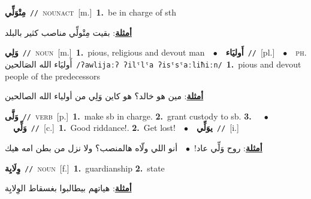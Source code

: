 \documentclass[10pt,a4paper,twoside]{article} %
\begin{document}
\begin{multicols}{2}
{\setlength\topsep{0pt}\textbf{\foreignlanguage{arabic}{مِتْوَلِّي}}\ {\color{gray}\texttt{//}\color{black}}\ \textsc{noun\textunderscore act}\ [m.]\ \textbf{1.}~be in charge of sth\  \begin{flushright}\color{gray}\foreignlanguage{arabic}{\textbf{\underline{\foreignlanguage{arabic}{أمثلة}}}: بقيت مِتْولِّي مناصب كثير بالبلد}\end{flushright}\color{black}} \vspace{2mm}

{\setlength\topsep{0pt}\textbf{\foreignlanguage{arabic}{وَلِي}}\ {\color{gray}\texttt{//}\color{black}}\ \textsc{noun}\ [m.]\ \textbf{1.}~pious, religious and devout man\ \ $\bullet$\ \ \setlength\topsep{0pt}\textbf{\foreignlanguage{arabic}{أَوليَاء}}\ {\color{gray}\texttt{//}\color{black}}\ [pl.]\ \ $\bullet$\ \ \textsc{ph.} \color{gray} \foreignlanguage{arabic}{أَوليَاء الله الصَالحين}\color{black}\ {\color{gray}\texttt{/{\sffamily ʔawlijaːʔ ʔilˤlˤa ʔisˤsˤaːliħiːn}/}\color{black}}\ \textbf{1.}~pious and devout people of the predecessors\  \begin{flushright}\color{gray}\foreignlanguage{arabic}{\textbf{\underline{\foreignlanguage{arabic}{أمثلة}}}: مين هو خالد؟ هو كاين وَلِي من أولياء الله الصالحين}\end{flushright}\color{black}} \vspace{2mm}

{\setlength\topsep{0pt}\textbf{\foreignlanguage{arabic}{وَلَّى}}\ {\color{gray}\texttt{//}\color{black}}\ \textsc{verb}\ [p.]\ \textbf{1.}~make sb in charge.  \textbf{2.}~grant custody to sb.  \textbf{3.}~\ \ $\bullet$\ \ \setlength\topsep{0pt}\textbf{\foreignlanguage{arabic}{وَلِّي}}\ {\color{gray}\texttt{//}\color{black}}\ [c.]\ \textbf{1.}~Good riddance!.  \textbf{2.}~Get lost!\ \ $\bullet$\ \ \setlength\topsep{0pt}\textbf{\foreignlanguage{arabic}{يوَلِّي}}\ {\color{gray}\texttt{//}\color{black}}\ [i.]\  \begin{flushright}\color{gray}\foreignlanguage{arabic}{\textbf{\underline{\foreignlanguage{arabic}{أمثلة}}}: روح وَلِّي عاد!\ $\bullet$\ \  أنو اللي ولّاه هالمنصب؟ ولا نزل من بطن امه هيك}\end{flushright}\color{black}} \vspace{2mm}

{\setlength\topsep{0pt}\textbf{\foreignlanguage{arabic}{وِلَايِة}}\ {\color{gray}\texttt{//}\color{black}}\ \textsc{noun}\ [f.]\ \textbf{1.}~guardianship  \textbf{2.}~state\  \begin{flushright}\color{gray}\foreignlanguage{arabic}{\textbf{\underline{\foreignlanguage{arabic}{أمثلة}}}: هياتهم بيطالبوا بغسقاط الوِلايِة}\end{flushright}\color{black}} \vspace{2mm}


\end{multicols}
\end{document}
